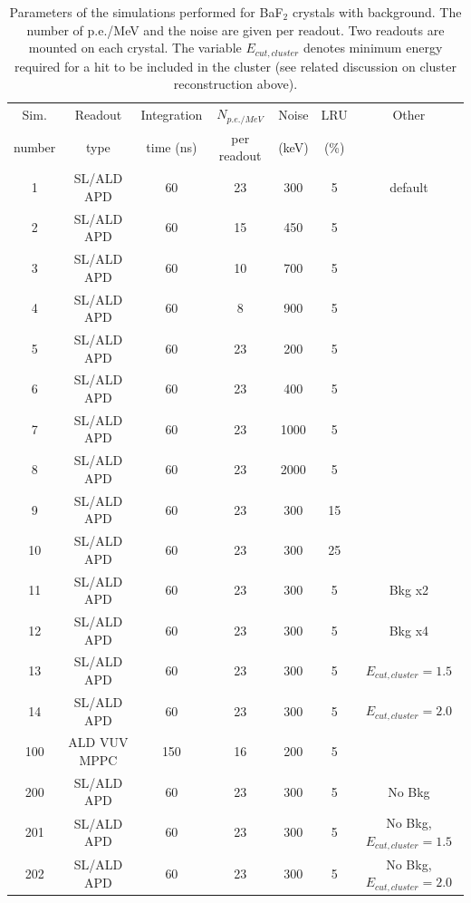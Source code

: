 \begin{table}[htb]
\begin{center}
\begin{tabular}{|c|c|c|c|c|c|c|}\hline
Sim.   & Readout      & Integration & $N_{p.e./ MeV}$ & Noise & LRU & Other \\ 
number & type         & time (ns)   &   per readout   & (keV) & (\%)& \\\hline
1      & SL/ALD APD   &  60         & 23              & 300   &  5  & default \\
2      & SL/ALD APD   &  60         & 15              & 450   &  5  & \\
3      & SL/ALD APD   &  60         & 10              & 700   &  5  & \\
4      & SL/ALD APD   &  60         &  8              & 900   &  5  & \\
5      & SL/ALD APD   &  60         & 23              & 200   &  5  & \\
6      & SL/ALD APD   &  60         & 23              & 400   &  5  & \\
7      & SL/ALD APD   &  60         & 23              &1000   &  5  & \\
8      & SL/ALD APD   &  60         & 23              &2000   &  5  & \\
9      & SL/ALD APD   &  60         & 23              & 300   & 15  & \\
10     & SL/ALD APD   &  60         & 23              & 300   & 25  & \\
11     & SL/ALD APD   &  60         & 23              & 300   &  5  & Bkg x2 \\
12     & SL/ALD APD   &  60         & 23              & 300   &  5  & Bkg x4 \\
13     & SL/ALD APD   &  60         & 23              & 300   &  5  & $E_{cut,cluster} = 1.5$  \\
14     & SL/ALD APD   &  60         & 23              & 300   &  5  & $E_{cut,cluster} = 2.0$  \\
100    & ALD VUV MPPC & 150         & 16              & 200   &  5  &        \\ \hline
200    & SL/ALD APD   &  60         & 23              & 300   &  5  & No Bkg \\ 
201    & SL/ALD APD   &  60         & 23              & 300   &  5  & No Bkg, $E_{cut,cluster} = 1.5$ \\ 
202    & SL/ALD APD   &  60         & 23              & 300   &  5  & No Bkg, $E_{cut,cluster} = 2.0$ \\ \hline
\end{tabular}
\end{center}
\caption{Parameters of the simulations performed for BaF$_2$ crystals with background. The number of 
p.e./MeV and the noise are given per readout. Two readouts are mounted on each crystal. The variable 
$E_{cut,cluster}$ denotes minimum energy required for a hit to be included in the cluster (see related discussion on cluster reconstruction above).}
\label{sim:tab::BaF2}
\end{table}   

